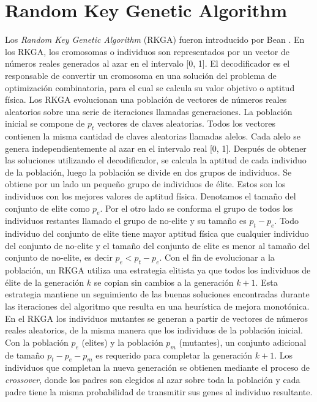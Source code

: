 \section{Random Key Genetic Algorithm}

Los \textit{Random Key Genetic Algorithm} (RKGA) fueron introducido por Bean \cite{Bean}. En los RKGA, los cromosomas o individuos son representados por un vector de números reales generados al azar en el intervalo [0, 1]. El decodificador es el responsable de convertir un cromosoma en una solución del problema de optimización combinatoria, para el cual se calcula su valor objetivo o aptitud física. Los RKGA evolucionan una población de vectores de números reales aleatorios sobre una serie de iteraciones llamadas generaciones. La población inicial se compone de $p_t$ vectores de claves aleatorias. Todos los vectores contienen la misma cantidad de claves aleatorias llamadas alelos. Cada alelo se genera independientemente al azar en el intervalo real [0, 1]. Después de obtener las soluciones utilizando el decodificador, se calcula la aptitud de cada individuo de la población, luego la población se divide en dos grupos de individuos. Se obtiene por un lado un pequeño grupo de individuos de élite. Estos son los individuos con los mejores valores de aptitud física. Denotamos el tamaño del conjunto de elite como $p_e$. Por el otro lado se conforma el grupo de todos los individuos restantes llamado el grupo de no-elite y su tamaño es $p_t-p_e$. Todo individuo del conjunto de elite tiene mayor aptitud física que cualquier individuo del conjunto de no-elite y el tamaño del conjunto de elite es menor al tamaño del conjunto de no-elite, es decir $p_e<p_t-p_e$. Con el fin de evolucionar a la población, un RKGA utiliza una estrategia elitista ya que todos los individuos de élite de la generación $k$ se copian sin cambios a la generación $k+1$. Esta estrategia mantiene un seguimiento de las buenas soluciones encontradas durante las iteraciones del algoritmo que resulta en una heurística de mejora monotónica. En el RKGA los individuos mutantes se generan a partir de vectores de números reales aleatorios, de la misma manera que los individuos de la población inicial. Con la población $p_e$ (elites) y la población $p_m$ (mutantes), un conjunto adicional de tamaño $p_t - p_e - p_m$ es requerido para completar la generación $k+1$. Los individuos que completan la nueva generación se obtienen mediante el proceso de \textit{crossover}, donde los padres son elegidos al azar sobre toda la población y cada padre tiene la misma probabilidad de transmitir sus genes al individuo resultante.

